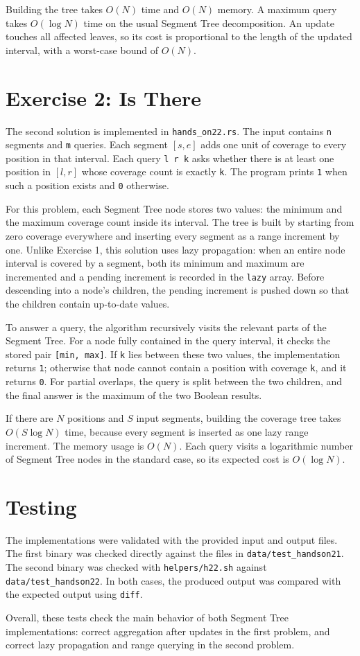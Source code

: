 \documentclass[11pt,a4paper]{article}
\begin{document}
Building the tree takes \(O(N)\) time and \(O(N)\) memory. A maximum query
takes \(O(\log N)\) time on the usual Segment Tree decomposition. An update
touches all affected leaves, so its cost is proportional to the length of the
updated interval, with a worst-case bound of \(O(N)\).

\section*{Exercise 2: Is There}
The second solution is implemented in \texttt{hands\_on22.rs}. The input
contains \texttt{n} segments and \texttt{m} queries. Each segment \([s,e]\)
adds one unit of coverage to every position in that interval. Each query
\texttt{l r k} asks whether there is at least one position in \([l,r]\) whose
coverage count is exactly \texttt{k}. The program prints \texttt{1} when such
a position exists and \texttt{0} otherwise.

For this problem, each Segment Tree node stores two values: the minimum and
the maximum coverage count inside its interval. The tree is built by starting
from zero coverage everywhere and inserting every segment as a range
increment by one. Unlike Exercise 1, this solution uses lazy propagation:
when an entire node interval is covered by a segment, both its minimum and
maximum are incremented and a pending increment is recorded in the
\texttt{lazy} array. Before descending into a node's children, the pending
increment is pushed down so that the children contain up-to-date values.

To answer a query, the algorithm recursively visits the relevant parts of the
Segment Tree. For a node fully contained in the query interval, it checks the
stored pair \texttt{[min, max]}. If \texttt{k} lies between these two values,
the implementation returns \texttt{1}; otherwise that node cannot contain a
position with coverage \texttt{k}, and it returns \texttt{0}. For partial
overlaps, the query is split between the two children, and the final answer is
the maximum of the two Boolean results.

If there are \(N\) positions and \(S\) input segments, building the coverage
tree takes \(O(S \log N)\) time, because every segment is inserted as one
lazy range increment. The memory usage is \(O(N)\). Each query visits a
logarithmic number of Segment Tree nodes in the standard case, so its expected
cost is \(O(\log N)\).

\section*{Testing}
The implementations were validated with the provided input and output files.
The first binary was checked directly against the files in
\texttt{data/test\_handson21}. The second binary was checked with
\texttt{helpers/h22.sh} against \texttt{data/test\_handson22}. In both cases,
the produced output was compared with the expected output using \texttt{diff}.

Overall, these tests check the main behavior of both Segment Tree
implementations: correct aggregation after updates in the first problem, and
correct lazy propagation and range querying in the second problem.
\end{document}
